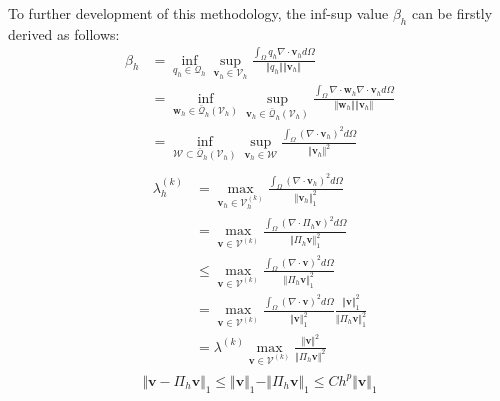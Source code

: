 To further development of this methodology, the inf-sup value $\beta_h$ can be firstly derived as follows:
\begin{equation}
\begin{split}
\beta_h &= \inf_{q_h \in \mathcal Q_h} \sup_{\boldsymbol v_h \in \mathcal V_h} \frac{\int_{\Omega} q_h \nabla \cdot \boldsymbol v_h d\Omega}{\Vert q_h \Vert \Vert \boldsymbol v_h \Vert} \\
    &= \inf_{\boldsymbol w_h \in \bar{\mathcal Q}_h(\mathcal V_h)} \sup_{\boldsymbol v_h \in \bar{\mathcal Q}_h(\mathcal V_h)} \frac{\int_{\Omega} \nabla \cdot \boldsymbol w_h \nabla \cdot \boldsymbol v_h d\Omega}{\Vert \boldsymbol w_h \Vert \Vert \boldsymbol v_h \Vert} \\ 
    &= \inf_{\mathcal W \subset \bar{\mathcal Q}_h(\mathcal V_h)} \sup_{\boldsymbol v_h \in \mathcal W} \frac{\int_{\Omega} (\nabla \cdot \boldsymbol v_h)^2 d\Omega}{\Vert \boldsymbol v_h \Vert^2} \\
\end{split}
\end{equation}
\begin{equation}
\begin{split}
    \lambda^{(k)}_h &= \max_{\boldsymbol v_h \in \mathcal V_h^{(k)}} \frac{\int_{\Omega} (\nabla \cdot \boldsymbol v_h)^2 d\Omega}{\Vert \boldsymbol v_h \Vert_1^2} \\
                    &= \max_{\boldsymbol v \in \mathcal V^{(k)}} \frac{\int_{\Omega} (\nabla \cdot \Pi_h \boldsymbol v)^2 d\Omega}{\Vert \Pi_h \boldsymbol v \Vert_1^2} \\
                    &\le \max_{\boldsymbol v \in \mathcal V^{(k)}} \frac{\int_{\Omega} (\nabla \cdot \boldsymbol v)^2 d\Omega}{\Vert \Pi_h \boldsymbol v \Vert_1^2} \\
                    &= \max_{\boldsymbol v \in \mathcal V^{(k)}} \frac{\int_{\Omega} (\nabla \cdot \boldsymbol v)^2 d\Omega}{\Vert \boldsymbol v \Vert_1^2} \frac{\Vert \boldsymbol v \Vert_1^2}{\Vert \Pi_h \boldsymbol v \Vert_1^2} \\
                    &= \lambda^{(k)}\max_{\boldsymbol v \in \mathcal V^{(k)}} \frac{\Vert \boldsymbol v \Vert^2}{\Vert \Pi_h \boldsymbol v \Vert^2} \\
\end{split}
\end{equation}
\begin{equation}
\Vert \boldsymbol v - \Pi_h \boldsymbol v \Vert_1 \le \Vert \boldsymbol v \Vert_1 - \Vert \Pi_h \boldsymbol v \Vert_1 \le Ch^{p}\Vert \boldsymbol v \Vert_1
\end{equation}

